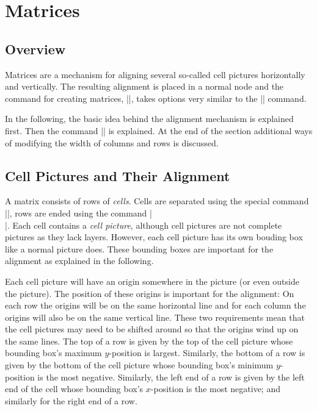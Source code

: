 %
%
%


\section{Matrices}

\label{section-base-matrices}

\subsection{Overview}

Matrices are a mechanism for aligning several so-called cell pictures 
horizontally and vertically. The resulting alignment is placed in a
normal node and the command for creating matrices, |\pgfmatrix|, takes
options very similar to the |\pgfnode| command.

In the following, the basic idea behind the alignment mechanism is
explained first. Then the command |\pgfmatrix| is explained. At the
end of the section additional ways of modifying the width of columns
and rows is discussed.


\subsection{Cell Pictures and Their Alignment}

A matrix consists of rows of \emph{cells}. Cells are separated using
the special command |\pgfmatrixnextcell|, rows are ended using the
command |\\|. Each cell contains a \emph{cell picture}, although cell
pictures are not complete pictures as they lack layers. However, each
cell picture has its own bouding box like a normal picture does. These
bounding boxes are important for the alignment as explained
in the following.

Each cell picture will have an origin somewhere in the picture (or
even outside the picture). The position of these origins is important
for the alignment: On each row the origins will be on the same
horizontal line and for each column the origins will also be on the
same vertical line. These two requirements mean that the cell pictures
may need to be shifted around so that the origins wind up on the same
lines. The top of a row is given by the top of the cell picture whose
bounding box's maximum $y$-position is largest. Similarly, the bottom
of a row is given by the bottom of the cell picture whose bounding
box's minimum $y$-position is the most negative. Similarly, the left
end of a row is given by the left end of the cell whose bounding box's
$x$-position is the most negative; and similarly for the right end of
a row.

